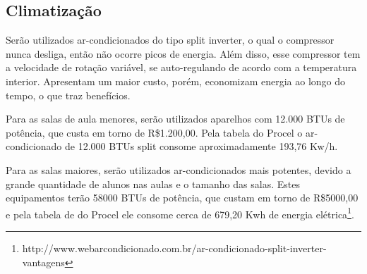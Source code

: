 \subsection{Climatização}

Serão utilizados ar-condicionados do tipo split inverter, o qual o compressor nunca desliga, então não ocorre picos de energia. Além disso, esse compressor tem a velocidade de rotação variável, se auto-regulando de acordo com a temperatura interior. Apresentam um maior custo, porém, economizam energia ao longo do tempo, o que traz benefícios.

Para as salas de aula menores, serão utilizados aparelhos com 12.000 BTUs de potência, que custa em torno de R\$1.200,00. Pela tabela do Procel o ar-condicionado de 12.000 BTUs split consome aproximadamente 193,76 Kw/h.

Para as salas maiores, serão utilizados ar-condicionados mais potentes, devido a grande quantidade de alunos nas aulas e o tamanho das salas. Estes equipamentos terão 58000 BTUs de potência, que custam em torno de R\$5000,00 e pela tabela de do Procel ele consome cerca de 679,20 Kwh de energia elétrica\footnote{http://www.webarcondicionado.com.br/ar-condicionado-split-inverter-vantagens}.

